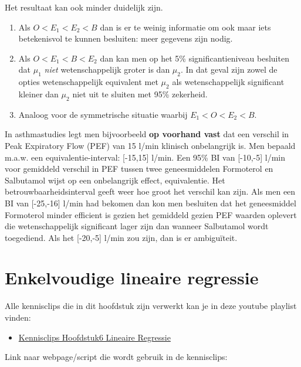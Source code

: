 \documentclass[
  12pt,dutch,coursenotes]{book}
\providecommand{\tightlist}{%
  \setlength{\itemsep}{0pt}\setlength{\parskip}{0pt}}
\begin{document}
Het resultaat kan ook minder duidelijk zijn.

\begin{enumerate}
\def\labelenumi{\arabic{enumi}.}
\tightlist
\item
  Als \(O < E_1 < E_2 < B\) dan is er te weinig informatie om ook maar iets betekenisvol te kunnen besluiten: meer gegevens zijn nodig.
\item
  Als \(O < E_1 < B < E_2\) dan kan men op het 5\% significantieniveau besluiten dat \(\mu_1\) \emph{niet} wetenschappelijk groter is dan \(\mu_2\). In dat geval zijn zowel de opties wetenschappelijk equivalent met \(\mu_2\) als wetenschappelijk significant kleiner dan \(\mu_2\) niet uit te sluiten met 95\% zekerheid.
\item
  Analoog voor de symmetrische situatie waarbij \(E_1 < O < E_2 < B.\)
\end{enumerate}

In asthmastudies legt men bijvoorbeeld \textbf{op voorhand vast} dat een verschil in Peak Expiratory Flow (PEF) van 15 l/min klinisch onbelangrijk is. Men bepaald m.a.w. een equivalentie-interval: {[}-15,15{]} l/min. Een 95\% BI van {[}-10,-5{]} l/min voor gemiddeld verschil in PEF tussen twee geneesmiddelen Formoterol en Salbutamol wijst op een onbelangrijk effect, equivalentie. Het betrouwbaarheidsinterval geeft weer hoe groot het verschil kan zijn.
Als men een BI van {[}-25,-16{]} l/min had bekomen dan kon men besluiten dat het geneesmiddel Formoterol minder efficient is gezien het gemiddeld gezien PEF waarden oplevert die wetenschappelijk significant lager zijn dan wanneer Salbutamol wordt toegediend. Als het {[}-20,-5{]} l/min zou zijn, dan is er ambiguïteit.

\hypertarget{chap-linReg}{%
\chapter{Enkelvoudige lineaire regressie}\label{chap-linReg}}

Alle kennisclips die in dit hoofdstuk zijn verwerkt kan je in deze youtube playlist vinden:

\begin{itemize}
\tightlist
\item
  \href{https://www.youtube.com/playlist?list=PLZH1hP8_LbJJyNBiMlv24sSI0oKB8EtI0}{Kennisclips Hoofdstuk6 Lineaire Regressie}
\end{itemize}

Link naar webpage/script die wordt gebruik in de kennisclips:
\end{document}
